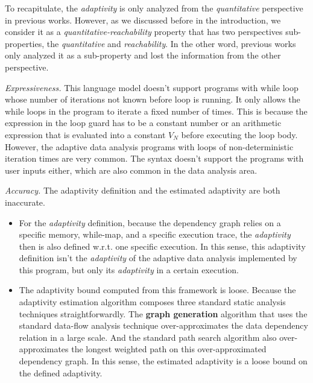 To recapitulate, the \emph{adaptivity} is only analyzed from the \emph{quantitative} perspective in previous works.
However, as we discussed before in the introduction, we consider it as a \emph{quantitative-reachability} property
that has two perspectives sub-properties, the  \emph{quantitative} and \emph{reachability}.
In the other word, previous works only analyzed it as a sub-property and lost the information from the other perspective.

\emph{Expressiveness.}
    This language model doesn't support programs with while loop whose number of iterations not known before loop is running.
    It only allows the while loops in the program to iterate a fixed number of times.
    This is because the expression in the loop guard has to be a constant number
    or an arithmetic expression
    that is evaluated into a constant $V_N$ before executing the loop body.
    However, the adaptive data analysis programs with loops of non-deterministic iteration times are very common.
    The syntax doesn't support the programs with user inputs either, which are also common in the data analysis area.

\emph{Accuracy.}
 The adaptivity definition and the estimated adaptivity are both inaccurate.
    \begin{itemize}
        \item 
        For the \emph{adaptivity} definition,
    because the dependency graph relies on a specific memory, while-map, and a specific execution trace,
    the \emph{adaptivity} then is also defined w.r.t. one specific
    execution.
    In this sense, this adaptivity definition isn't the \emph{adaptivity} of the adaptive data analysis
    implemented by this program,
    but only its \emph{adaptivity} in a certain execution.
    \item
    The adaptivity bound computed from this framework is loose.
    Because the adaptivity estimation algorithm composes three standard static analysis techniques straightforwardly.
    The \textbf{graph generation} algorithm that uses the standard data-flow analysis technique
    over-approximates the data dependency relation in a large scale.
    And the standard path search algorithm also over-approximates the longest weighted path on this over-approximated dependency graph. 
    In this sense, the estimated adaptivity is a loose bound on the defined adaptivity.
 \end{itemize}

